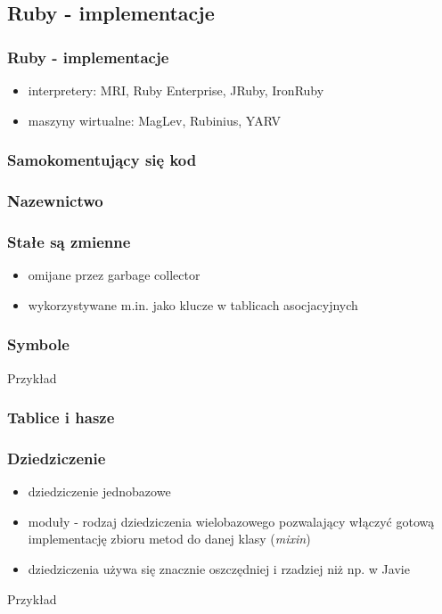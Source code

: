 \documentclass[12t]{beamer}
\begin{document}
\subsection{Ruby - implementacje}
\begin{frame}
  \frametitle{Ruby - implementacje}
  \begin{itemize}
  \item interpretery: MRI, Ruby Enterprise, JRuby, IronRuby
  \item maszyny wirtualne: MagLev, Rubinius, YARV
  \end{itemize}
\end{frame}

\begin{frame}[fragile]
  \frametitle{Samokomentujący się kod}
  
\end{frame}

\begin{frame}[fragile]
  \frametitle{Nazewnictwo}
  \begin{small}
    
  \end{small}
\end{frame}

\begin{frame}[fragile]
  \frametitle{Stałe są zmienne}
  
\end{frame}

\begin{frame}[fragile]
  \begin{itemize}
  \item omijane przez garbage collector
  \item wykorzystywane m.in. jako klucze w tablicach asocjacyjnych
  \end{itemize}
  \frametitle{Symbole}
  \begin{block}{Przykład}
    
  \end{block}
\end{frame}

\begin{frame}[fragile]
  \frametitle{Tablice i hasze}
  
\end{frame}

\begin{frame}[fragile]
  \frametitle{Dziedziczenie}
  \begin{itemize}
  \item dziedziczenie jednobazowe
  \item moduły - rodzaj dziedziczenia wielobazowego pozwalający
    włączyć gotową implementację zbioru metod do danej klasy
    (\emph{mixin})
  \item dziedziczenia używa się znacznie oszczędniej i rzadziej niż
    np. w Javie
  \end{itemize}
  \begin{block}{Przykład}
    
  \end{block}
\end{frame}
\end{document}
